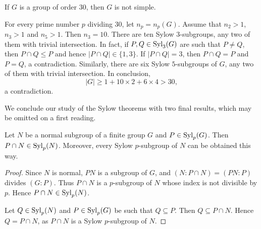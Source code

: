 \begin{example}
If $G$ is a group of order 30, then $G$ is not simple.

For every prime number $p$ dividing 30, let $n_p=n_p(G)$. Assume that
$n_2>1$, $n_3>1$ and $n_5>1$.
 Then $n_3=10$. There are ten 
Sylow $3$-subgroups, any two of them with trivial intersection. 
In fact, if $P,Q\in\mathrm{Syl}_3(G)$ are such that 
 $P\ne Q$, then $P\cap Q\leq P$ and hence 
$|P\cap Q|\in\{1,3\}$. If $|P\cap Q|=3$, then $P\cap Q=P$ and $P=Q$, a contradiction. Similarly, 
there are six Sylow $5$-subgroups of $G$, any two of them with 
trivial intersection. In conclusion,
\[
|G|\geq 1+10\times 2+6\times 4>30,
\]
a contradiction.
\end{example}

We conclude our study of the Sylow theorems with two final results, which may be omitted on a first reading.

\begin{optional}
\begin{theorem}
    Let $N$ be a normal subgroup of a finite group 
    $G$ and $P\in\mathrm{Syl}_p(G)$. Then 
    $P\cap N\in\mathrm{Syl}_p(N)$. Moreover, every Sylow 
    $p$-subgroup of $N$  
    can be obtained this way.
\end{theorem}

\begin{proof}
    Since $N$ is normal, $PN$ is a subgroup of $G$, and
    $(N:P\cap N)=(PN:P)$ divides $(G:P)$. 
Thus $P\cap N$ is a $p$-subgroup of $N$ whose index
is not divisible by $p$. Hence $P\cap N\in\mathrm{Syl}_p(N)$.

    Let $Q\in\mathrm{Syl}_p(N)$ and $P\in\mathrm{Syl}_p(G)$ be such that
    $Q\subseteq P$. Then
    $Q\subseteq P\cap N$. Hence 
    $Q=P\cap N$, as $P\cap N$ is a Sylow $p$-subgroup of $N$. 
\end{proof}
\end{optional}

